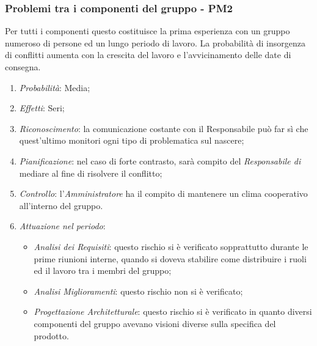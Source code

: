 \subsubsection{Problemi tra i componenti del gruppo - PM2}
Per tutti i componenti questo  costituisce la prima esperienza con un gruppo numeroso di persone ed un lungo periodo di lavoro. La probabilit\`a di insorgenza di conflitti aumenta con la crescita del lavoro e l'avvicinamento delle date di consegna.
\begin{enumerate}
\item \textit{Probabilit\`a}: Media;
\item \textit{Effetti}: Seri;
\item \textit{Riconoscimento}: la comunicazione costante con il Responsabile può far sì che quest’ultimo monitori ogni tipo di problematica sul nascere;
\item \textit{Pianificazione}: nel caso di forte contrasto, sar\`a compito del \textit{Responsabile di } mediare al fine di risolvere il conflitto;
\item \textit{Controllo}: l'\textit{Amministratore} ha il compito di mantenere un clima cooperativo all'interno del gruppo.
\item \textit{Attuazione nel periodo}: 
	\begin{itemize}
	\item \textit{Analisi dei Requisiti}: questo rischio si è verificato sopprattutto durante le prime riunioni interne, quando si doveva stabilire come distribuire i ruoli ed il lavoro tra i membri del gruppo;
	\item \textit{Analisi Miglioramenti}: questo rischio non si è verificato;
	\item \textit{Progettazione Architetturale}: questo rischio si è verificato in quanto diversi componenti del gruppo avevano visioni diverse sulla specifica del prodotto.
	\end{itemize}
\end{enumerate} 

